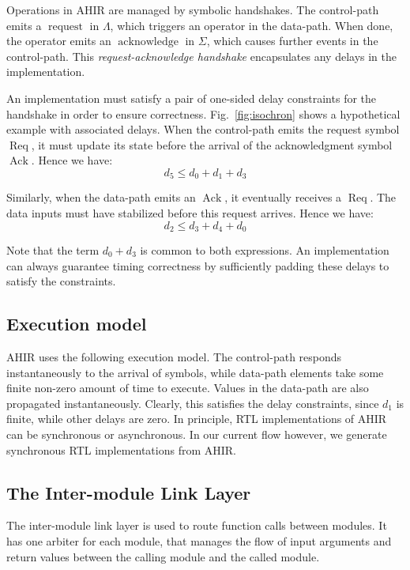 \documentclass[conference]{IEEEtran}
\newcommand{\sym}[1]{$\operatorname{#1}$}
\begin{document}
Operations in AHIR are managed by symbolic handshakes. The
control-path emits a \sym{request} in $\Lambda$, which triggers an
operator in the data-path. When done, the operator emits an
\sym{acknowledge} in $\Sigma$, which causes further events in the
control-path. This \emph{request-acknowledge handshake} encapsulates
any delays in the implementation.

An implementation must satisfy a pair of one-sided delay constraints
for the handshake in order to ensure correctness.
Fig.~\ref{fig:isochron} shows a hypothetical example with associated
delays. When the control-path emits the request symbol \sym{Req}, it
must update its state before the arrival of the acknowledgment symbol
\sym{Ack}. Hence we have:
\[d_5 \le d_0 + d_1 + d_3\]

Similarly, when the data-path emits an \sym{Ack}, it eventually
receives a \sym{Req}. The data inputs must have stabilized before
this request arrives. Hence we have:
\[d_2 \le d_3 + d_4 + d_0\]

Note that the term $d_0 + d_3$ is common to both expressions. An
implementation can always guarantee timing correctness by sufficiently
padding these delays to satisfy the constraints.

\subsection{Execution model}

AHIR uses the following execution model. The control-path responds
instantaneously to the arrival of symbols, while data-path elements
take some finite non-zero amount of time to execute. Values in the data-path are also
propagated instantaneously. Clearly, this satisfies the delay
constraints, since $d_1$ is finite, while other delays are zero.  
In principle, RTL implementations of AHIR can be synchronous or asynchronous.  In 
our current flow however, we generate synchronous RTL implementations from
AHIR.

\subsection{The Inter-module Link Layer}

The inter-module link layer is used to route function calls between
modules. It has one arbiter for each module, that manages the flow of
input arguments and return values between the calling module and the
called module. 
\end{document}
